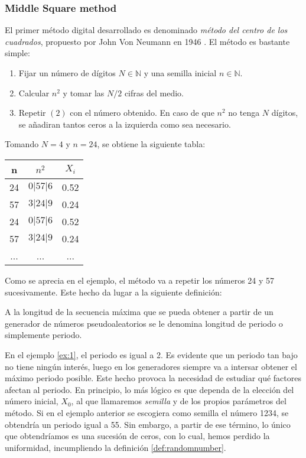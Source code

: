 \subsubsection{Middle Square method}

El primer método digital desarrollado es denominado \textit{método del centro de los cuadrados}, propuesto por John Von Neumann en 1946 \cite{von195113}. El método es bastante simple:

\begin{enumerate}
\item Fijar un número de dígitos $N\in\mathbb{N}$ y una semilla inicial $n\in\mathbb{N}$.
\item Calcular $n^2$ y tomar las $N/2$ cifras del medio.
\item Repetir $(2)$ con el número obtenido. En caso de que $n^2$ no tenga $N$ dígitos, se añadiran tantos ceros a la izquierda como sea necesario.
\end{enumerate}

\begin{example}\label{ex:1}
Tomando $N=4$ y $n=24$, se obtiene la siguiente tabla:
\begin{center}
\begin{tabular}{|c|c|c|}
 \hline 
 n & $n^2$ & $X_i$ \\ 
 \hline 
 24 & $0|57|6$ & 0.52 \\ 
 \hline 
 57 & $3|24|9$ & 0.24 \\ 
 \hline 
 24 & $0|57|6$ & 0.52 \\ 
 \hline 
 57 & $3|24|9$ & 0.24 \\ 
 \hline 
 ... & ... & ... \\ 
 \hline 
 \end{tabular} 
\end{center}
\end{example}

Como se aprecia en el ejemplo, el método va a repetir los números 24 y 57 sucesivamente. Este hecho da lugar a la siguiente definición:

\begin{definition}
A la longitud de la secuencia máxima que se pueda obtener a partir de un generador de números pseudoaleatorios se le denomina longitud de periodo o simplemente periodo.
\end{definition}

En el ejemplo \ref{ex:1}, el periodo es igual a 2. Es evidente que un periodo tan bajo no tiene ningún interés, luego en los generadores siempre va a intersar obtener el máximo periodo posible. Este hecho provoca la necesidad de estudiar qué factores afectan al periodo. En principio, lo más lógico es que dependa de la elección del número inicial, $X_0$, al que llamaremos \textit{semilla} y de los propios parámetros del método. Si en el ejemplo anterior se escogiera como semilla el número 1234, se obtendría un periodo igual a 55. Sin embargo, a partir de ese término, lo único que obtendríamos es una sucesión de ceros, con lo cual, hemos perdido la uniformidad, incumpliendo la definición \ref{def:randomnumber}.

